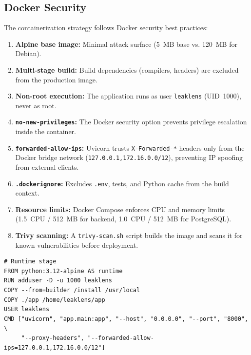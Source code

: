 \subsection{Docker Security}

The containerization strategy follows Docker security best practices:

\begin{enumerate}[nosep]
  \item \textbf{Alpine base image:} Minimal attack surface (5~MB base vs.
        120~MB for Debian).
  \item \textbf{Multi-stage build:} Build dependencies (compilers, headers)
        are excluded from the production image.
  \item \textbf{Non-root execution:} The application runs as user
        \texttt{leaklens} (UID~1000), never as root.
  \item \textbf{\texttt{no-new-privileges}:} The Docker security option
        prevents privilege escalation inside the container.
  \item \textbf{\texttt{forwarded-allow-ips}:} Uvicorn trusts
        \texttt{X-Forwarded-*} headers only from the Docker bridge network
        (\texttt{127.0.0.1,172.16.0.0/12}), preventing IP spoofing from
        external clients.
  \item \textbf{\texttt{.dockerignore}:} Excludes \texttt{.env}, tests, and
        Python cache from the build context.
  \item \textbf{Resource limits:} Docker Compose enforces CPU and memory
        limits (1.5~CPU / 512~MB for backend, 1.0~CPU / 512~MB for
        PostgreSQL).
  \item \textbf{Trivy scanning:} A \texttt{trivy-scan.sh} script builds the
        image and scans it for known vulnerabilities before deployment.
\end{enumerate}

\begin{lstlisting}[language={},caption={Dockerfile excerpt --- non-root user and restricted forwarding.},label={lst:dockerfile}]
# Runtime stage
FROM python:3.12-alpine AS runtime
RUN adduser -D -u 1000 leaklens
COPY --from=builder /install /usr/local
COPY ./app /home/leaklens/app
USER leaklens
CMD ["uvicorn", "app.main:app", "--host", "0.0.0.0", "--port", "8000", \
     "--proxy-headers", "--forwarded-allow-ips=127.0.0.1,172.16.0.0/12"]
\end{lstlisting}

